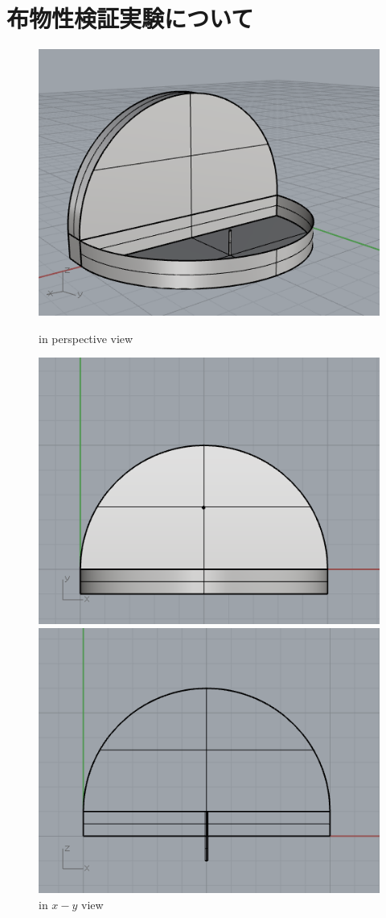 \documentclass[11pt]{jsarticle}
\begin{document}
	\section{布物性検証実験について}
		\begin{figure}[thpb]
			\begin{minipage}{0.5\hsize}
				\centering
				\includegraphics[width = 0.6\columnwidth]{./figure/ExperimentDevice.png}
				\caption{in perspective view}
			\end{minipage}
			\begin{minipage}{0.5\hsize}
				\centering
				\includegraphics[width = 0.6\columnwidth]{./figure/ExperimentDevice_xyview.png}
				\caption{in $ x-y $ view}
			\end{minipage}
			\begin{minipage}{0.5\hsize}
				\centering
				\includegraphics[width = 0.6\columnwidth]{./figure/ExperimentDevice_zxview.png}

\end{minipage}
\end{figure}
\end{document}
